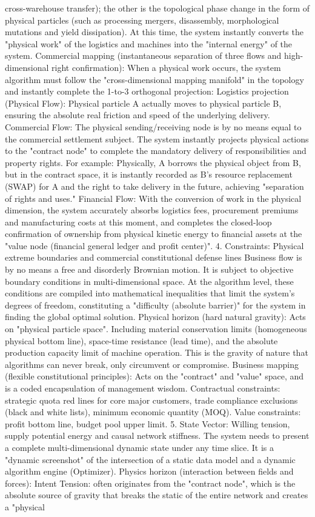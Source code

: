 \documentclass[11pt,a4paper]{article}
\begin{document}
cross-warehouse transfer); the other is the topological phase change in the form of physical particles (such as processing mergers, disassembly, morphological mutations and yield dissipation). At this time, the system instantly converts the "physical work" of the logistics and machines into the "internal energy" of the system. Commercial mapping (instantaneous separation of three flows and high-dimensional right confirmation): When a physical work occurs, the system algorithm must follow the "cross-dimensional mapping manifold" in the topology and instantly complete the 1-to-3 orthogonal projection: Logistics projection (Physical Flow): Physical particle A actually moves to physical particle B, ensuring the absolute real friction and speed of the underlying delivery. Commercial Flow: The physical sending/receiving node is by no means equal to the commercial settlement subject. The system instantly projects physical actions to the "contract node" to complete the mandatory delivery of responsibilities and property rights. For example: Physically, A borrows the physical object from B, but in the contract space, it is instantly recorded as B's resource replacement (SWAP) for A and the right to take delivery in the future, achieving "separation of rights and uses." Financial Flow: With the conversion of work in the physical dimension, the system accurately absorbs logistics fees, procurement premiums and manufacturing costs at this moment, and completes the closed-loop confirmation of ownership from physical kinetic energy to financial assets at the "value node (financial general ledger and profit center)". 4. Constraints: Physical extreme boundaries and commercial constitutional defense lines Business flow is by no means a free and disorderly Brownian motion. It is subject to objective boundary conditions in multi-dimensional space. At the algorithm level, these conditions are compiled into mathematical inequalities that limit the system's degrees of freedom, constituting a "difficulty (absolute barrier)" for the system in finding the global optimal solution. Physical horizon (hard natural gravity): Acts on "physical particle space". Including material conservation limits (homogeneous physical bottom line), space-time resistance (lead time), and the absolute production capacity limit of machine operation. This is the gravity of nature that algorithms can never break, only circumvent or compromise. Business mapping (flexible constitutional principles): Acts on the "contract" and "value" space, and is a coded encapsulation of management wisdom. Contractual constraints: strategic quota red lines for core major customers, trade compliance exclusions (black and white lists), minimum economic quantity (MOQ). Value constraints: profit bottom line, budget pool upper limit. 5. State Vector: Willing tension, supply potential energy and causal network stiffness. The system needs to present a complete multi-dimensional dynamic state under any time slice. It is a "dynamic screenshot" of the intersection of a static data model and a dynamic algorithm engine (Optimizer). Physics horizon (interaction between fields and forces): Intent Tension: often originates from the "contract node", which is the absolute source of gravity that breaks the static of the entire network and creates a "physical 
\end{document}
